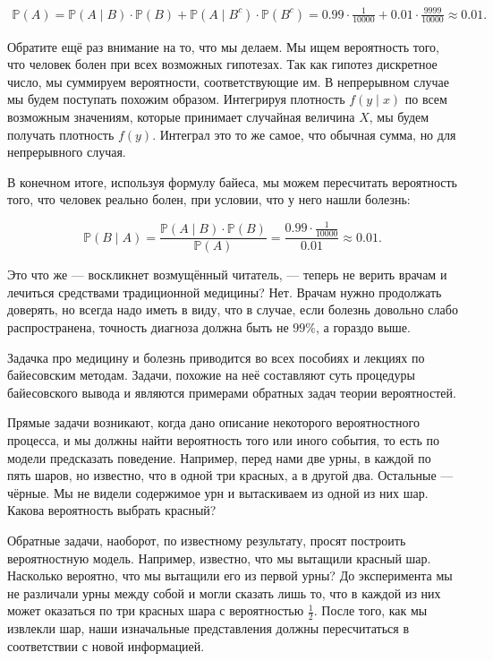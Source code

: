 \documentclass[12pt, a4paper, oneside]{extreport}
\def \mbb{\mathbb}
\def \PP{\mbb{P}}
\theoremstyle{plain}              %
\theoremstyle{definition}         %
\begin{document}
\begin{multline*}
\PP(A)  = \PP(A\mid B) \cdot \PP(B) + \PP(A \mid B^{c})  \cdot \PP(B^{c})  = 0.99 \cdot \frac{1}{10000} + 0.01 \cdot \frac{9999}{10000} \approx 0.01.
\end{multline*}

Обратите ещё раз внимание на то, что мы делаем. Мы ищем вероятность того, что человек болен при всех возможных гипотезах. Так как гипотез дискретное число, мы суммируем вероятности, соответствующие им.  В непрерывном случае мы будем поступать похожим образом.  Интегрируя плотность $f(y \mid x)$ по всем возможным значениям, которые принимает случайная величина $X$, мы будем получать плотность $f(y)$. Интеграл это то же самое, что обычная сумма, но для непрерывного случая.

В конечном итоге, используя формулу байеса, мы можем пересчитать вероятность того, что человек реально болен, при условии, что у него нашли болезнь:

\[  \PP(B \mid A) = \frac{ \PP(A \mid B)\cdot \PP(B) }{\PP(A)}  = \frac{0.99 \cdot \frac{1}{10000}}{0.01} \approx 0.01. \]

Это что же --- воскликнет возмущённый читатель, --- теперь не верить врачам и лечиться средствами традиционной медицины? Нет. Врачам нужно продолжать доверять, но всегда надо иметь в виду, что в случае, если болезнь довольно слабо распространена, точность диагноза должна быть не $99\%$, а гораздо выше.

Задачка про медицину и болезнь приводится во всех пособиях и лекциях по байесовским методам. Задачи, похожие на неё составляют суть процедуры байесовского вывода и являются примерами обратных задач теории вероятностей.

Прямые задачи возникают, когда дано описание некоторого вероятностного процесса, и мы должны найти вероятность того или иного события, то есть по модели предсказать поведение. Например, перед нами две урны, в каждой по пять шаров, но известно, что в одной три красных, а в другой два. Остальные --- чёрные.  Мы не видели содержимое урн и вытаскиваем из одной из них шар. Какова вероятность выбрать красный? 

Обратные задачи, наоборот, по известному результату, просят построить вероятностную модель.  Например, известно, что мы вытащили красный шар. Насколько вероятно, что мы вытащили его из первой урны?  До эксперимента мы не различали урны между собой и могли сказать лишь то, что в каждой из них может оказаться по три красных шара с вероятностью $\frac{1}{2}$. После того, как мы извлекли шар,  наши изначальные представления должны пересчитаться в соответствии с новой информацией.
\end{document}
